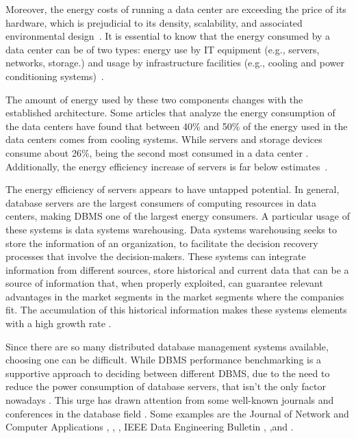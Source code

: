 Moreover, the energy costs of running a data center are exceeding the price of its hardware, which is prejudicial to its density, scalability, and associated environmental design~\cite{jin2014survey,rasmussen2011determining,greenframework}. 
It is essential to know that the energy consumed by a data center can be of two types: energy use by IT equipment (e.g., servers, networks, storage.) and usage by infrastructure facilities (e.g., cooling and power conditioning systems)~\cite{dayarathna2015data,portela2016}.


The amount of energy used by these two components changes with the established architecture. Some articles that analyze the energy consumption of the data centers have found that between 40\% and 50\% of the energy used in the data centers comes from cooling systems. While servers and storage devices consume about 26\%, being the second most consumed in a data center \cite{portela2016,dayarathna2015data,info2007top,VANHEDDEGHEM201464}. 
Additionally, the energy efficiency increase of servers is far below estimates~\cite{graefe2008database,jin2014survey}.

The energy efficiency of servers appears to have untapped potential. In general, database servers are the largest consumers of computing resources in data centers, making DBMS one of the largest energy consumers. A particular usage of these systems is data systems warehousing. Data systems warehousing seeks to store the information of an organization, to facilitate the decision recovery processes that involve the decision-makers. These systems can integrate information from different sources, store historical and current data that can be a source of information that, when properly exploited, can guarantee relevant advantages in the market segments in the market segments where the companies fit. The accumulation of this historical information makes these systems elements with a high growth rate \cite{inmon1996data,gonccalves2014estabelecimento,inmon1995data}. 





Since there are so many distributed database management systems available, choosing one can be difficult. While DBMS performance benchmarking is a supportive approach to deciding between different DBMS, due to the need to reduce the power consumption of database servers, that isn't the only factor nowadays \cite{greenframework,seybold2019mowgli}. This urge has drawn attention from some well-known journals and conferences in the database field \cite{greenframework}. 
Some examples are the Journal of Network and Computer Applications \cite{greenframework},  \cite{gesi2008enabling},  \cite{xu2010building} , IEEE Data Engineering Bulletin \cite{lang2011rethinking},  \cite{pelley2011query},and  \cite{tu2011power}.

